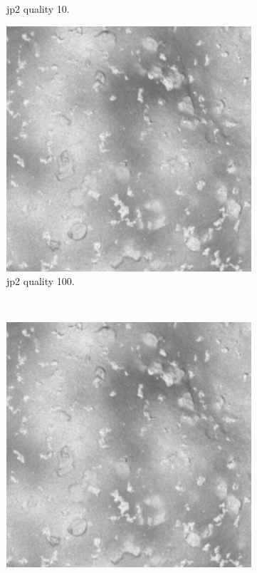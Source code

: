 \begin{figure}[htb]
\begin{subfigure}[b]{0.44\textwidth}
            \caption{\gls{jp2} quality 10.}
            \label{fig:img_quality_10}
        \end{subfigure}
        \begin{subfigure}[b]{0.44\textwidth}
            \centering
            \includegraphics[width=\textwidth]{doc/thesis/0_figures/compare_quality/set1/jp2_100_center.png}
            \caption{\gls{jp2} quality 100.}
            \label{fig:img_quality_100}
        \end{subfigure}
        \\
        \begin{subfigure}[b]{0.44\textwidth}
            \centering
            \includegraphics[width=\textwidth]{doc/thesis/0_figures/compare_quality/set1/jp2_1000_center.png}

\end{subfigure}
\end{figure}
